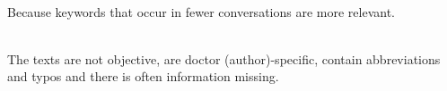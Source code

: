 \begin{quiz}
  ~\\
  Because keywords that occur in fewer conversations are more relevant.
\end{quiz}

\begin{quiz}
  ~\\
  The texts are not objective, are doctor (author)-specific, contain
  abbreviations and typos and there is often information missing.
\end{quiz}

